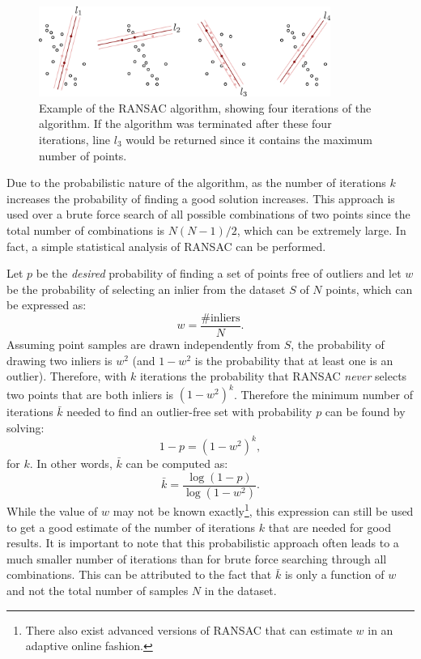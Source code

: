 \begin{figure}[ht]
  \centering
  \includegraphics[width=0.85\textwidth]{tex/figs/ch12_fig/ransac.png}
\caption{Example of the RANSAC algorithm, showing four iterations of the algorithm. If the algorithm was terminated after these four iterations, line $l_3$ would be returned since it contains the maximum number of points.}
\label{fig:ransac-working}
\end{figure}

Due to the probabilistic nature of the algorithm, as the number of iterations $k$ increases the probability of finding a good solution increases. This approach is used over a brute force search of all possible combinations of two points since the total number of combinations is $N(N-1)/2$, which can be extremely large. In fact, a simple statistical analysis of RANSAC can be performed.

Let $p$ be the \textit{desired} probability of finding a set of points free of outliers and let $w$ be the probability of selecting an inlier from the dataset $S$ of $N$ points, which can be expressed as:
\begin{equation*}
    w = \frac{\text{\# inliers}}{N}.
\end{equation*}
Assuming point samples are drawn independently from $S$, the probability of drawing two inliers is $w^2$ (and $1-w^2$ is the probability that at least one is an outlier). Therefore, with $k$ iterations the probability that RANSAC \textit{never} selects two points that are both inliers is $(1-w^2)^k$. Therefore the minimum number of iterations $\bar{k}$ needed to find an outlier-free set with probability $p$ can be found by solving:
\begin{equation*}
    1-p = (1-w^2)^k,
\end{equation*}
for $k$. In other words, $\bar{k}$ can be computed as:
\begin{equation*}
    \bar{k} = \frac{\log (1-p)}{\log (1-w^2)}.
    \label{eq:magic-k}
\end{equation*}
While the value of $w$ may not be known exactly\footnote{There also exist advanced versions of RANSAC that can estimate $w$ in an adaptive online fashion.}, this expression can still be used to get a good estimate of the number of iterations $k$ that are needed for good results. It is important to note that this probabilistic approach often leads to a much smaller number of iterations than for brute force searching through all combinations. This can be attributed to the fact that $\bar{k}$ is only a function of $w$ and not the total number of samples $N$ in the dataset. 

